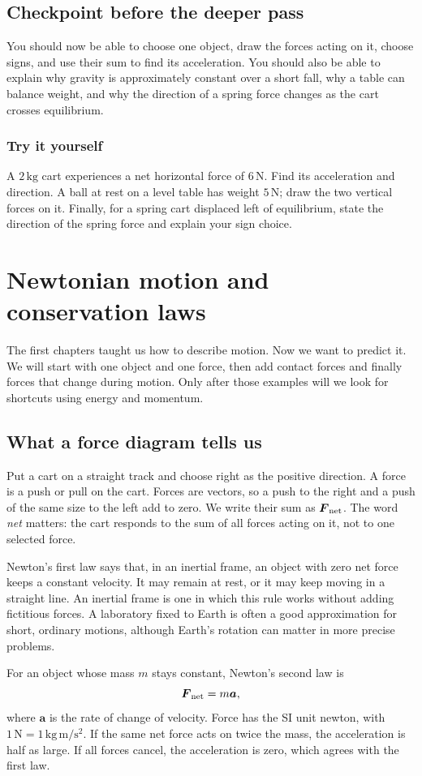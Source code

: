 \documentclass[11pt,oneside]{book}
\newcommand{\vect}[1]{\boldsymbol{#1}}
\theoremstyle{reviewstyle}
\newcommand{\learningcheck}[1]{\subsection*{Try it yourself}\noindent #1\par}
\begin{document}
\section{Checkpoint before the deeper pass}
You should now be able to choose one object, draw the forces acting on it, choose signs, and use their sum to find its acceleration. You should also be able to explain why gravity is approximately constant over a short fall, why a table can balance weight, and why the direction of a spring force changes as the cart crosses equilibrium.

\learningcheck{A $2\,\mathrm{kg}$ cart experiences a net horizontal force of $6\,\mathrm N$. Find its acceleration and direction. A ball at rest on a level table has weight $5\,\mathrm N$; draw the two vertical forces on it. Finally, for a spring cart displaced left of equilibrium, state the direction of the spring force and explain your sign choice.}

\chapter{Newtonian motion and conservation laws}
The first chapters taught us how to describe motion. Now we want to predict it. We will start with one object and one force, then add contact forces and finally forces that change during motion. Only after those examples will we look for shortcuts using energy and momentum.

\section{What a force diagram tells us}
Put a cart on a straight track and choose right as the positive direction. A force is a push or pull on the cart. Forces are vectors, so a push to the right and a push of the same size to the left add to zero. We write their sum as $\vect F_{\rm net}$. The word \emph{net} matters: the cart responds to the sum of all forces acting on it, not to one selected force.

Newton's first law says that, in an inertial frame, an object with zero net force keeps a constant velocity. It may remain at rest, or it may keep moving in a straight line. An inertial frame is one in which this rule works without adding fictitious forces. A laboratory fixed to Earth is often a good approximation for short, ordinary motions, although Earth's rotation can matter in more precise problems.

For an object whose mass $m$ stays constant, Newton's second law is
\begin{equation}
\vect F_{\rm net}=m\vect a,
\label{eq:newton-constant-mass}
\end{equation}
where $\vect a$ is the rate of change of velocity. Force has the SI unit newton, with $1\,\mathrm N=1\,\mathrm{kg\,m/s^2}$. If the same net force acts on twice the mass, the acceleration is half as large. If all forces cancel, the acceleration is zero, which agrees with the first law.
\end{document}
